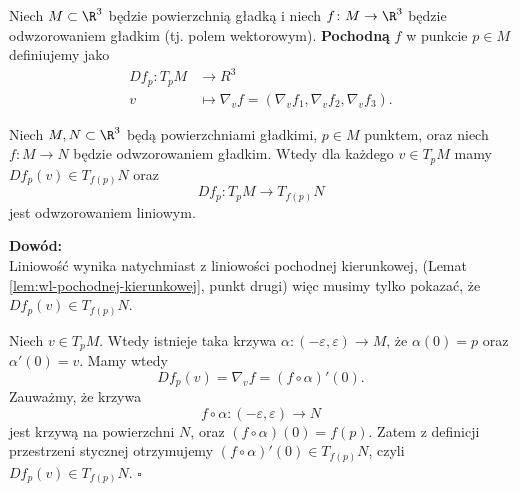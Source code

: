 \begin{frame}[<+->]

\begin{definicja}
Niech $M\subset \R^3$ będzie powierzchnią gładką i niech $f\colon M\to \R^3$ będzie odwzorowaniem gładkim (tj. polem wektorowym). \textbf{Pochodną} $f$ w punkcie $p\in M$ definiujemy jako
\begin{align*}
Df_p\colon T_pM&\to R^3\\
v&\mapsto \nabla_v f=\left(\nabla_v f_1,\nabla_v f_2,\nabla_v f_3\right).
\end{align*}
\end{definicja}

\end{frame}
\begin{frame}

\begin{lemat}
Niech $M,N\subset \R^3$ będą powierzchniami gładkimi, $p\in M$ punktem, oraz niech $f\colon M\to N$ będzie odwzorowaniem gładkim. Wtedy dla każdego $v\in T_pM$ mamy $Df_p(v)\in T_{f(p)}N$ oraz \[Df_p\colon T_pM\to T_{f(p)}N\] jest odwzorowaniem liniowym.

\end{lemat}

\pause \textcolor{ared}{\textbf{Dowód:}}\\\pause
Liniowość wynika natychmiast z liniowości pochodnej kierunkowej, (Lemat \ref{lem:wl-pochodnej-kierunkowej}, punkt drugi) więc musimy tylko pokazać, że $Df_p(v)\in T_{f(p)}N$.

\end{frame}
\begin{frame}[<+->]

Niech $v\in T_pM$. Wtedy istnieje taka krzywa $\alpha\colon (-\varepsilon,\varepsilon)\to M$, że $\alpha(0)=p$ oraz $\alpha'(0)=v$. Mamy wtedy \[Df_p(v)=\nabla_v f=(f\circ \alpha)'(0).\]
\pause Zauważmy, że krzywa \[f\circ\alpha\colon (-\varepsilon,\varepsilon)\to N\] jest krzywą na powierzchni $N$, oraz $(f\circ \alpha)(0)=f(p)$. \pause Zatem z definicji przestrzeni stycznej otrzymujemy $(f\circ \alpha)'(0)\in T_{f(p)}N$, czyli $Df_p(v)\in T_{f(p)}N$.
\hfill $\square$

\end{frame}
